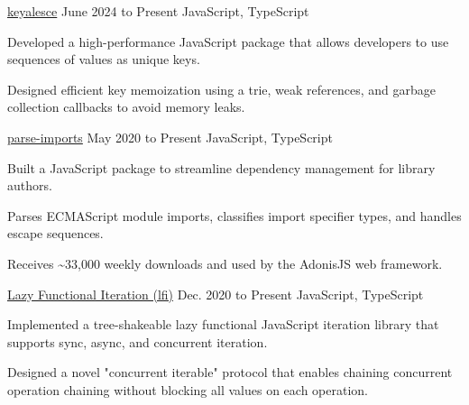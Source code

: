
\begin{cventry}
    {\href{https://github.com/TomerAberbach/keyalesce}{keyalesce}}{}
    {June 2024 to Present}
    {JavaScript, TypeScript}
    \begin{cvitems}
        \item Developed a high-performance JavaScript package that allows developers to use sequences of values as unique keys.
        \item Designed efficient key memoization using a trie, weak references, and garbage collection callbacks to avoid memory leaks.
    \end{cvitems}
\end{cventry}

\begin{cventry}
    {\href{https://github.com/TomerAberbach/parse-imports}{parse-imports}}{}
    {May 2020 to Present}
    {JavaScript, TypeScript}
    \begin{cvitems}
        \item Built a JavaScript package to streamline dependency management for library authors. \item Parses ECMAScript module imports, classifies import specifier types, and handles escape sequences.
        \item Receives \~{}33,000 weekly downloads and used by the AdonisJS web framework.
    \end{cvitems}
\end{cventry}

\begin{cventry}
    {\href{https://github.com/TomerAberbach/lfi}{Lazy Functional Iteration (lfi)}}{}
    {Dec. 2020 to Present}
    {JavaScript, TypeScript}
    \begin{cvitems}
        \item Implemented a tree-shakeable lazy functional JavaScript iteration library that supports sync, async, and concurrent iteration.
        \item Designed a novel "concurrent iterable" protocol that enables chaining concurrent operation chaining without blocking all values on each operation.
    \end{cvitems}
\end{cventry}
